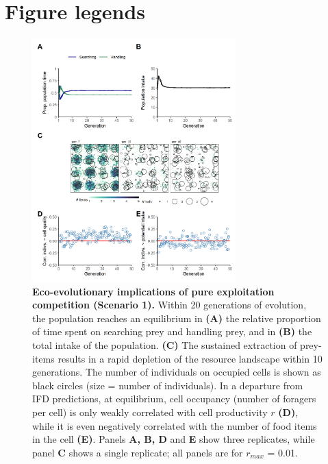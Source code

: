 \documentclass[11pt]{article}
\begin{document}
\newpage{}

\section{Figure legends}

\begin{figure}[h!]
    \centering
    \includegraphics[width=0.70\textwidth]{figures/fig_01.png}
    \caption{
        \textbf{Eco-evolutionary implications of pure exploitation competition (Scenario 1).}
        Within 20 generations of evolution, the population reaches an equilibrium in \textbf{(A)} the relative proportion of time spent on searching prey and handling prey, and in \textbf{(B)} the total intake of the population.
        \textbf{(C)} The sustained extraction of prey-items results in a rapid depletion of the resource landscape within 10 generations. The number of individuals on occupied cells is shown as black circles (size = number of individuals).
        In a departure from IFD predictions, at equilibrium, cell occupancy (number of foragers per cell) is only weakly correlated with cell productivity $r$ \textbf{(D)}, while it is even negatively correlated with the number of food items in the cell \textbf{(E)}.
        Panels \textbf{A, B, D} and \textbf{E} show three replicates, while panel \textbf{C} shows a single replicate; all panels are for $r_{max}$ = 0.01.
    }
    \label{Fig:Model1}
\end{figure}
\end{document}
